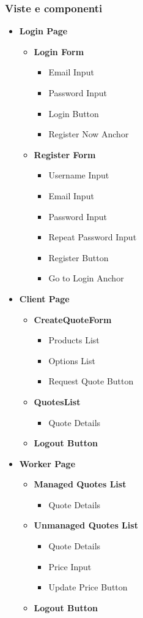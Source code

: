 \documentclass[a4paper, 12pt]{article}
\begin{document}
\subsubsection{Viste e componenti}
\begin{itemize}
	\item \textbf{Login Page}
	\begin{itemize}
		\item \textbf{Login Form}
		\begin{itemize}
			\item Email Input
			\item Password Input
			\item Login Button
			\item Register Now Anchor
		\end{itemize}
		\item \textbf{Register Form}
		\begin{itemize}
			\item Username Input
			\item Email Input
			\item Password Input
			\item Repeat Password Input
			\item Register Button
			\item Go to Login Anchor
		\end{itemize}
	\end{itemize}
	\item \textbf{Client Page}
	\begin{itemize}
		\item \textbf{CreateQuoteForm}
		\begin{itemize}
			\item Products List
			\item Options List
			\item Request Quote Button
		\end{itemize}
		\item \textbf{QuotesList}
		\begin{itemize}
			\item Quote Details
		\end{itemize}
		\item \textbf{Logout Button}
	\end{itemize}
	\item \textbf{Worker Page}
	\begin{itemize}
	\item \textbf{Managed Quotes List}
	\begin{itemize}
		\item Quote Details
	\end{itemize}
	\item \textbf{Unmanaged Quotes List}
	\begin{itemize}
		\item Quote Details
		\item Price Input
		\item Update Price Button
	\end{itemize}
		\item \textbf{Logout Button}
	\end{itemize}
\end{itemize}
\end{document}
